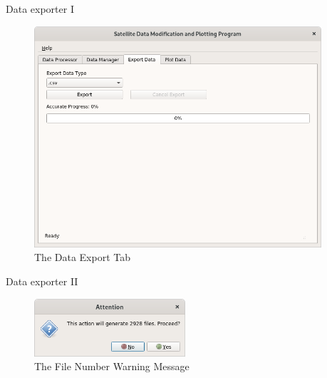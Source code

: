 \documentclass[
    hyperref={
        final,
        colorlinks=true,
        menucolor=black,
        anchorcolor=green,
        linkcolor=blue,
        citecolor=red,
        pdftitle={RS RAS Internship Presentation},
        pdfauthor={Moritz M. Konarski}
    }
]{beamer}
\begin{document}
\begin{frame}{Data exporter I}
\begin{figure}
    \includegraphics[width=0.95\textwidth]{../graphics/de01}
    \vspace{-8pt}
    \caption{The Data Export Tab}
\end{figure}
\end{frame}

\begin{frame}{Data exporter II}
\begin{figure}
    \includegraphics[width=0.5\textwidth]{../graphics/de02}
    \vspace{-8pt}
    \caption{The File Number Warning Message}
\end{figure}
\end{frame}
\end{document}
